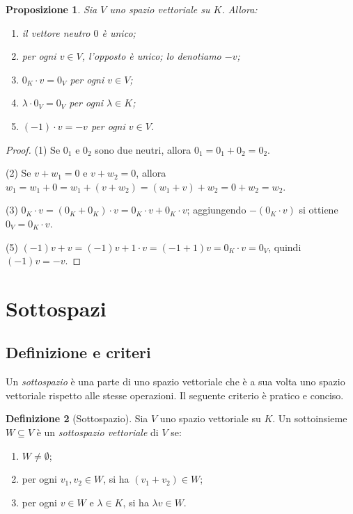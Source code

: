 \documentclass[11pt, a4paper]{book}
\theoremstyle{definition}
\newtheorem{definizione}{Definizione}[section]
\theoremstyle{plain}
\newtheorem{proposizione}[definizione]{Proposizione}
\theoremstyle{remark}
\begin{document}
\begin{proposizione}
Sia $V$ uno spazio vettoriale su $K$. Allora:
\begin{enumerate}
  \item il vettore neutro $0$ è unico;
  \item per ogni $v \in V$, l'opposto è unico; lo denotiamo $-v$;
  \item $0_K \cdot v = 0_V$ per ogni $v \in V$;
  \item $\lambda \cdot 0_V = 0_V$ per ogni $\lambda \in K$;
  \item $(-1) \cdot v = -v$ per ogni $v \in V$.
\end{enumerate}
\end{proposizione}

\begin{proof}
(1) Se $0_1$ e $0_2$ sono due neutri, allora $0_1 = 0_1 + 0_2 = 0_2$.

(2) Se $v + w_1 = 0$ e $v + w_2 = 0$, allora $w_1 = w_1 + 0 = w_1 + (v + w_2) = (w_1 + v) + w_2 = 0 + w_2 = w_2$.

(3) $0_K \cdot v = (0_K + 0_K) \cdot v = 0_K \cdot v + 0_K \cdot v$; aggiungendo $-(0_K \cdot v)$ si ottiene $0_V = 0_K \cdot v$.

(5) $(-1)v + v = (-1)v + 1 \cdot v = (-1+1)v = 0_K \cdot v = 0_V$, quindi $(-1)v = -v$.
\end{proof}

\section{Sottospazi}

\subsection{Definizione e criteri}

Un \emph{sottospazio} è una parte di uno spazio vettoriale che è a sua volta uno spazio vettoriale rispetto alle stesse operazioni. Il seguente criterio è pratico e conciso.

\begin{defbox}
\begin{definizione}[Sottospazio]
Sia $V$ uno spazio vettoriale su $K$. Un sottoinsieme $W \subseteq V$ è un \emph{sottospazio vettoriale} di $V$ se:
\begin{enumerate}
  \item[(a)] $W \neq \emptyset$;
  \item[(b)] per ogni $v_1, v_2 \in W$, si ha $(v_1 + v_2) \in W$;
  \item[(c)] per ogni $v \in W$ e $\lambda \in K$, si ha $\lambda v \in W$.
\end{enumerate}
\end{definizione}
\end{defbox}
\end{document}
